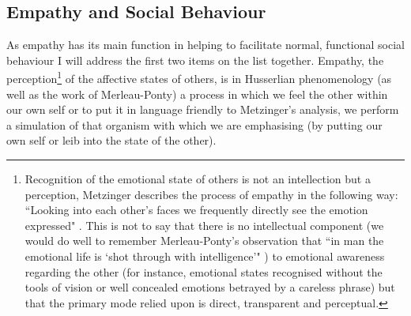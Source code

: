 \subsection{Empathy and Social Behaviour}

As empathy has its main function in helping to facilitate normal, functional social behaviour I will address the first two items on the list together. Empathy, the perception\footnote{Recognition of the emotional state of others is not an intellection but a perception, Metzinger describes the process of empathy in the following way: ``Looking into each other's faces we frequently directly see the emotion expressed" \cite[p. 168]{metzinger2003}. This is not to say that there is no intellectual component (we would do well to remember Merleau-Ponty's observation that ``in man the emotional life is `shot through with intelligence'" \cite[p. 179]{merleauponty1962}) to emotional awareness regarding the other (for instance, emotional states recognised without the tools of vision or well concealed emotions betrayed by a careless phrase) but that the primary mode relied upon is direct, transparent and perceptual.} of the affective states of others, is in Husserlian phenomenology (as well as the work of Merleau-Ponty) a process in which we feel the other within our own self or to put it in language friendly to Metzinger's analysis, we perform a simulation of that organism with which we are emphasising (by putting our own self or leib into the state of the other).

